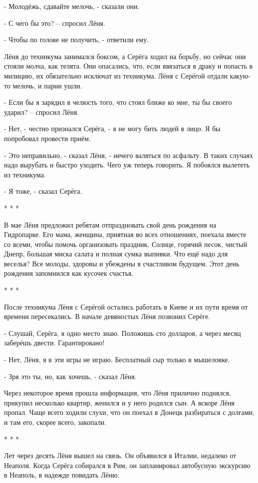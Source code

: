 - Молодёжь, сдавайте мелочь, - сказали они.

- С чего бы это? – спросил Лёня.

- Чтобы по голове не получить, - ответили ему.

Лёня до техникума занимался боксом, а Серёга ходил на борьбу, но сейчас они
стояли молча, как телята. Они опасались, что, если ввязаться в драку и попасть
в милицию, их обязательно исключат из техникума. Лёня с Серёгой отдали какую-то
мелочь, и парни ушли.

- Если бы я зарядил в челюсть того, что стоял ближе ко мне, ты бы своего
ударил? – спросил Лёня.

- Нет, - честно признался Серёга, - я не могу бить людей в лицо. Я бы
попробовал провести приём.

- Это неправильно, - сказал Лёня, - нечего валяться по асфальту. В таких
случаях надо вырубать и быстро уходить. Чего уж теперь говорить. Я побоялся
вылететь из техникума.

- Я тоже, - сказал Серёга.

* * *

В мае Лёня предложил ребятам отпраздновать свой день рождения на Гидропарке.
Его мама, женщина, приятная во всех отношениях, поехала вместе со всеми, чтобы
помочь организовать праздник. Солнце, горячий песок, чистый Днепр, большая
миска салата и полная сумка выпивки. Что ещё надо для веселья? Все молоды,
здоровы и убеждены в счастливом будущем. Этот день рождения запомнился как
кусочек счастья.

* * *

После техникума Лёня с Серёгой остались работать в Киеве и их пути время от
времени пересекались. В начале девяностых Лёня позвонил Серёге.

- Слушай, Серёга, я одно место знаю. Положишь сто долларов, а через месяц
заберёшь двести. Гарантировано!

- Нет, Лёня, я в эти игры не играю. Бесплатный сыр только в мышеловке.

- Зря это ты, но, как хочешь, - сказал Лёня.

Через некоторое время прошла информация, что Лёня прилично поднялся, прикупил
несколько квартир, женился и у него родился сын. А вскоре Лёня пропал. Чаще
всего ходили слухи, что он поехал в Донецк разбираться с долгами, и там его,
скорее всего, закопали.

* * *

Лет через десять Лёня вышел на связь. Он объявился в Италии, недалеко от
Неаполя. Когда Серёга собирался в Рим, он запланировал автобусную экскурсию в
Неаполь, в надежде повидать Лёню.

